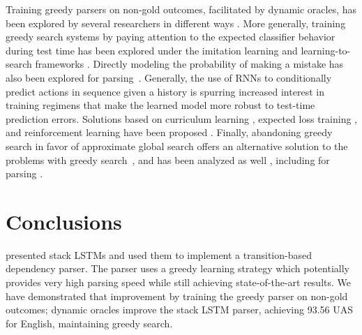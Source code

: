 \documentclass[11pt]{article}
\newcommand{\ignore}[1]{}
\begin{document}
Training greedy parsers on non-gold outcomes, facilitated by 
dynamic oracles, has been explored by several researchers in different ways
\cite{goldberg12dynamic,goldberg2013training,goldberg2013tabular,honnibal2013non,honnibal2014joint,gomez2014polynomial,bjorkelund2015non,tokgoz2015transition,gomez2015efficient,TACL659}.
More generally, training greedy search systems by paying attention to the
expected classifier behavior during test time has been explored under the
imitation learning and learning-to-search frameworks
\cite{abbeel2004apprenticeship,daume05,vlachos12,he12,daume09,ross11,icml2015_changb15}. Directly modeling the probability of making a mistake has also been explored for parsing~\cite{yazdani-henderson:2015:CoNLL}. Generally, the use of RNNs to conditionally predict actions in
sequence given a history is spurring increased interest in training
regimens that make the learned model more robust to test-time
prediction errors. Solutions based on curriculum learning
\cite{bengio2015scheduled}, expected loss training \cite{shen:2015},
and reinforcement learning have been proposed \cite{ranzato}. Finally,
abandoning greedy search in favor of approximate global search offers
an alternative solution to the problems with greedy
search~\cite{andor-16}, and has been analyzed as well
\cite{Kulesza2007,Finley2008}, including for parsing \cite{martins-09}.

\ignore{Time and test time prediction was recently explored by \newcite{bengio2015scheduled} for the task of language modeling.
However, to the best of
our knowledge this is the first time that such a training procedure is explored
together with neural networks for parsing. The results show that the consistent
gains in accuracy due to dynamic oracle training that were observed in previous work
persist also for the very strong LSTM-based parser,
although some care had to be taken to adapt the training procedures to the
probabilistic nature of the objective, and to the high accuracy levels of the
underlying model.
}

\section{Conclusions}

 presented stack LSTMs and used them to implement a
transition-based dependency parser. The parser uses a greedy learning
strategy which potentially provides very high parsing speed while
still achieving state-of-the-art results. We have demonstrated that
improvement by training the greedy parser on
non-gold outcomes; dynamic oracles improve the stack LSTM parser, achieving 93.56 UAS for English, maintaining greedy search.
\end{document}

